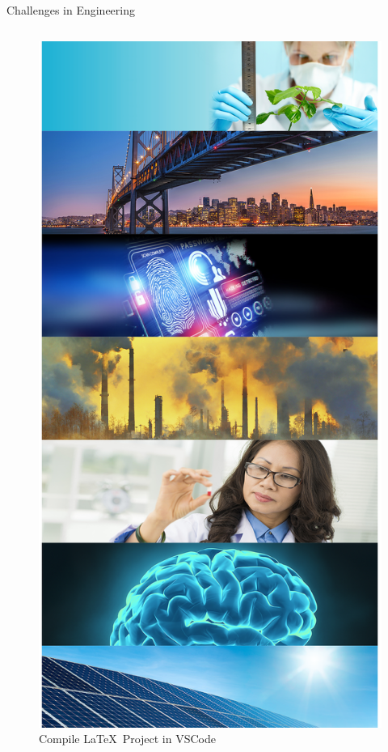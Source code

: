 \begin{frame}{Challenges in Engineering}
\begin{columns}
\begin{column}{.3\linewidth}
      \begin{figure}
        \centering
        \includegraphics[scale=0.1]{./figs/challenges/versions/drawing.png}
        \caption{Compile \LaTeX~Project in VSCode}
      \end{figure}


    \end{column}
  \end{columns}

\end{frame}






